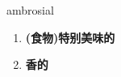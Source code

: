 
\begin{frame}
{\huge ambrosial}
\begin{center}
\begin{enumerate}\Large
  \item \textbf{(食物)特别美味的}
  \item \textbf{香的}
\end{enumerate}
\end{center}
\end{frame}
